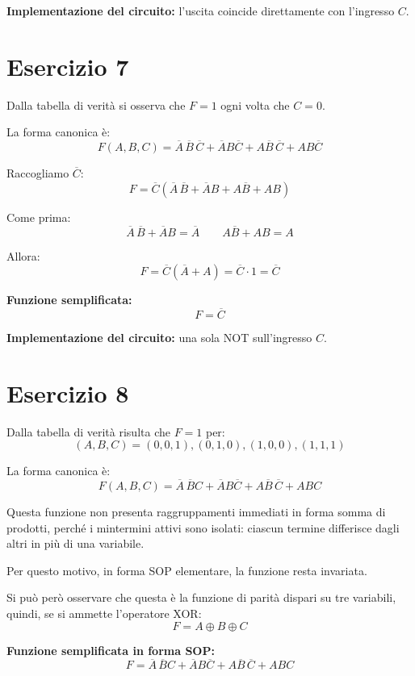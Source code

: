 \documentclass[a4paper,12pt]{article}
\begin{document}
	\textbf{Implementazione del circuito:} l'uscita coincide direttamente con l'ingresso $C$.
	
	\bigskip
	
	\section*{Esercizio 7}
	
	Dalla tabella di verità si osserva che $F=1$ ogni volta che $C=0$.
	
	La forma canonica è:
	\[
	F(A,B,C)=\overline{A}\,\overline{B}\,\overline{C}+\overline{A}B\overline{C}+A\overline{B}\,\overline{C}+AB\overline{C}
	\]
	
	Raccogliamo $\overline{C}$:
	\[
	F=\overline{C}(\overline{A}\,\overline{B}+\overline{A}B+A\overline{B}+AB)
	\]
	
	Come prima:
	\[
	\overline{A}\,\overline{B}+\overline{A}B=\overline{A}
	\qquad
	A\overline{B}+AB=A
	\]
	
	Allora:
	\[
	F=\overline{C}(\overline{A}+A)=\overline{C}\cdot 1=\overline{C}
	\]
	
	\textbf{Funzione semplificata:}
	\[
	\boxed{F=\overline{C}}
	\]
	
	\textbf{Implementazione del circuito:} una sola NOT sull'ingresso $C$.
	
	\bigskip
	
	\section*{Esercizio 8}
	
	Dalla tabella di verità risulta che $F=1$ per:
	\[
	(A,B,C)=(0,0,1),(0,1,0),(1,0,0),(1,1,1)
	\]
	
	La forma canonica è:
	\[
	F(A,B,C)=\overline{A}\,\overline{B}C+\overline{A}B\overline{C}+A\overline{B}\,\overline{C}+ABC
	\]
	
	Questa funzione non presenta raggruppamenti immediati in forma somma di prodotti, perché i mintermini attivi sono isolati: ciascun termine differisce dagli altri in più di una variabile.
	
	Per questo motivo, in forma SOP elementare, la funzione resta invariata.
	
	Si può però osservare che questa è la funzione di parità dispari su tre variabili, quindi, se si ammette l'operatore XOR:
	\[
	F=A\oplus B\oplus C
	\]
	
	\textbf{Funzione semplificata in forma SOP:}
	\[
	\boxed{F=\overline{A}\,\overline{B}C+\overline{A}B\overline{C}+A\overline{B}\,\overline{C}+ABC}
	\]
	
\end{document}
